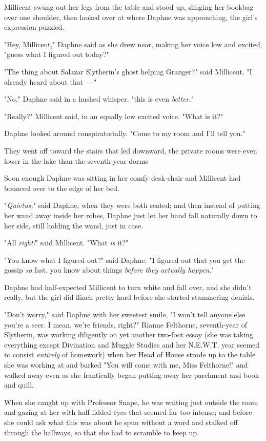 Millicent swung out her legs from the table and stood up, slinging her bookbag
over one shoulder, then looked over at where Daphne was approaching, the girl's
expression puzzled.

"Hey, Millicent," Daphne said as she drew near, making her voice low and
excited, "guess what I figured out today?"

"The thing about Salazar Slytherin's ghost helping Granger?" said Millicent. "I
already heard about that~---"

"No," Daphne said in a hushed whisper, "this is even \emph{better.}"

"Really?" Millicent said, in an equally low excited voice. "What is it?"

Daphne looked around conspiratorially. "Come to my room and I'll tell you."

They went off toward the stairs that led downward, the private rooms were even
lower in the lake than the seventh-year dorms{\el}

Soon enough Daphne was sitting in her comfy desk-chair and Millicent had
bounced over to the edge of her bed.

"\emph{Quietus,}" said Daphne, when they were both seated; and then instead of
putting her wand away inside her robes, Daphne just let her hand fall naturally
down to her side, still holding the wand, just in case.

"All \emph{right!}" said Millicent. "What \emph{is} it?"

"You know what I figured out?" said Daphne. "I figured out that you get the
gossip \emph{so} fast, you know about things \emph{before they actually
happen}."

Daphne had half-expected Millicent to turn white and fall over, and she didn't
really, but the girl did flinch pretty hard before she started stammering
denials.

"Don't worry," said Daphne with her sweetest smile, "I won't tell anyone else
you're a seer. I mean, we're friends, right?"
\sbreak
Rianne Felthorne, seventh-year of Slytherin, was working diligently on yet
another two-foot essay (she was taking everything except Divination and Muggle
Studies and her N.E.W.T. year seemed to consist \emph{entirely} of homework)
when her Head of House strode up to the table she was working at and barked
"You will come with me, Miss Felthorne!" and walked away even as she
frantically began putting away her parchment and book and quill.

When she caught up with Professor Snape, he was waiting just outside the room
and gazing at her with half-lidded eyes that seemed far too intense; and before
she could ask what this was about he spun without a word and stalked off
through the hallways, so that she had to scramble to keep up.

